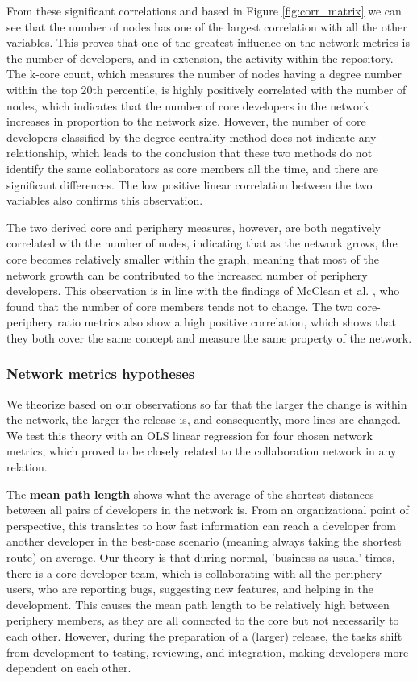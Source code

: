 From these significant correlations and based in Figure \ref{fig:corr_matrix} we can see that the number of nodes has one of the largest correlation with all the other variables. This proves that one of the greatest influence on the network metrics is the number of developers, and in extension, the activity within the repository. The k-core count, which measures the number of nodes having a degree number within the top 20th percentile, is highly positively correlated with the number of nodes, which indicates that the number of core developers in the network increases in proportion to the network size. However, the number of core developers classified by the degree centrality method does not indicate any relationship, which leads to the conclusion that these two methods do not identify the same collaborators as core members all the time, and there are significant differences. The low positive linear correlation between the two variables also confirms this observation.

The two derived core and periphery measures, however, are both negatively correlated with the number of nodes, indicating that as the network grows, the core becomes relatively smaller within the graph, meaning that most of the network growth can be contributed to the increased number of periphery developers. This observation is in line with the findings of McClean et al. \cite{mccleanSocialNetworkAnalysis2021}, who found that the number of core members tends not to change. The two core-periphery ratio metrics also show a high positive correlation, which shows that they both cover the same concept and measure the same property of the network.

\subsubsection{Network metrics hypotheses}

We theorize based on our observations so far that the larger the change is within the network, the larger the release is, and consequently, more lines are changed. We test this theory with an OLS linear regression for four chosen network metrics, which proved to be closely related to the collaboration network in any relation.

The \textbf{mean path length} shows what the average of the shortest distances between all pairs of developers in the network is. From an organizational point of perspective, this translates to how fast information can reach a developer from another developer in the best-case scenario (meaning always taking the shortest route) on average. Our theory is that during normal, 'business as usual' times, there is a core developer team, which is collaborating with all the periphery users, who are reporting bugs, suggesting new features, and helping in the development. This causes the mean path length to be relatively high between periphery members, as they are all connected to the core but not necessarily to each other. However, during the preparation of a (larger) release, the tasks shift from development to testing, reviewing, and integration, making developers more dependent on each other. 

